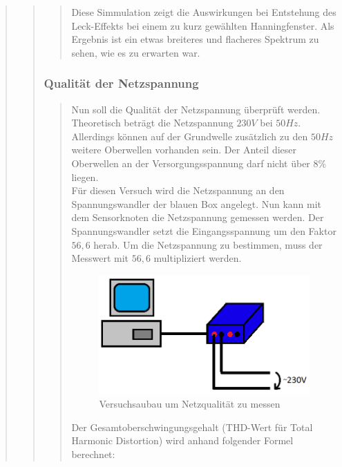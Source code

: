 \begin{quote}
\begin{quote}
\begin{quote}
		
		
		
		Diese Simmulation zeigt die Auswirkungen bei Entstehung des
		Leck-Effekts bei einem zu kurz gewählten Hanningfenster. Als Ergebnis ist ein
		etwas breiteres und flacheres Spektrum zu sehen, wie es zu erwarten war.
		
		\end{quote}
		
		\subsubsection{Qualität der Netzspannung}
		\begin{quote}
		Nun soll die Qualität der Netzspannung überprüft werden. Theoretisch beträgt die Netzspannung 
		$230V$ bei $50Hz$. Allerdings können auf der Grundwelle zusätzlich zu den
		$50Hz$ weitere Oberwellen vorhanden sein. Der Anteil dieser Oberwellen an der
		Versorgungsspannung darf nicht über $8\%$ liegen.\\
		Für diesen Versuch wird die Netzspannung an den Spannungswandler der blauen
		Box angelegt. Nun kann mit dem Sensorknoten die Netzspannung gemessen werden.
		Der Spannungswandler setzt die Eingangsspannung um den Faktor $56,6$ herab. Um die Netzspannung zu
		bestimmen, muss der Messwert mit $56,6$ multipliziert werden.
		
		\begin{figure}[htb]
		\centering
		\includegraphics[scale=0.6, trim = 0cm 0cm 0cm 0cm,
            clip]{./Bilder/Versuchsaufbau2}
		\caption{Versuchsaubau um Netzqualität zu messen}
		\end{figure}
		
		Der Gesamtoberschwingungsgehalt (THD-Wert für Total Harmonic Distortion) wird
		anhand folgender Formel berechnet:
		

\end{quote}
\end{quote}
\end{quote}
